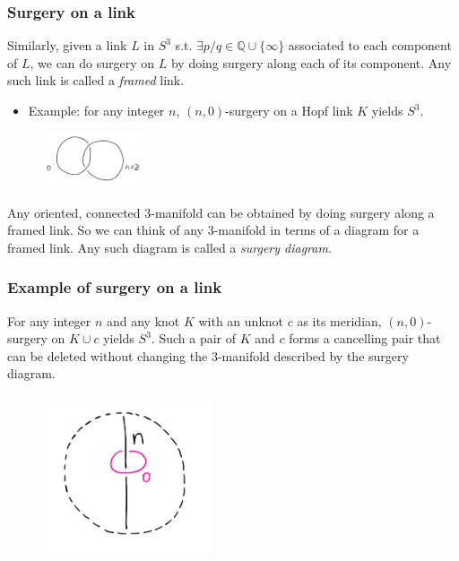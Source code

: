 \documentclass{beamer}
\theoremstyle{ex}
\theoremstyle{rem}
\begin{document}
	\begin{frame}
	\frametitle{Surgery on a link}
		\begin{definition}
		Similarly, given a link $L$ in $S^3$ s.t. $\exists p/q \in \mathbb{Q}\cup\{\infty\}$ associated to each component of $L$, we can do surgery on $L$ by doing surgery along each of its component. Any such link is called a \textit{framed} link. 
		\end{definition}
	\begin{itemize}
		\item Example: for any integer $n$, $(n, 0)$-surgery on a Hopf link $K$ yields $S^3$.
	\end{itemize}
	\begin{figure}
		\centering
		\includegraphics[width=30mm]{Hopf.jpg}
	\end{figure}
		\begin{theorem}
		Any oriented, connected $3$-manifold can be obtained by doing surgery along a framed link. So we can think of any $3$-manifold in terms of a diagram for a framed link. Any such diagram is called a \textit{surgery diagram}. 
		\end{theorem}
		
	\end{frame}

	\begin{frame}
	\frametitle{Example of surgery on a link}
		\begin{theorem}
		For any integer $n$ and any knot $K$ with an unknot $c$ as its meridian, $(n, 0)$-surgery on $K \cup c$ yields $S^3$. Such a pair of $K$ and $c$ forms a cancelling pair that can be deleted without changing the $3$-manifold described by the surgery diagram.
		\end{theorem}
		\begin{figure}
			\centering
			\includegraphics[width=50mm]{Kc.jpg}
		\end{figure}
	\end{frame}
\end{document}
